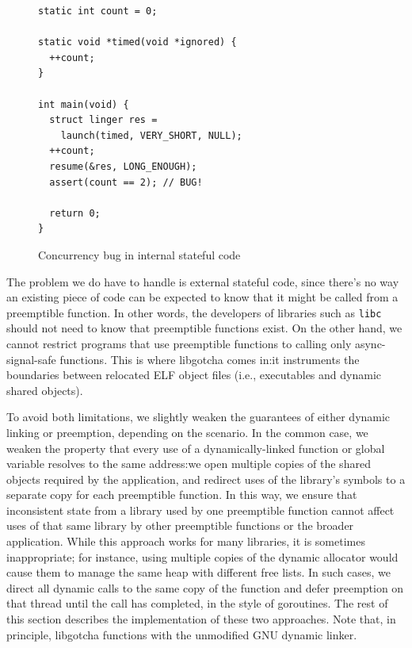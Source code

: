 \begin{figure}
\begin{verbatim}
static int count = 0;

static void *timed(void *ignored) {
  ++count;
}

int main(void) {
  struct linger res =
    launch(timed, VERY_SHORT, NULL);
  ++count;
  resume(&res, LONG_ENOUGH);
  assert(count == 2); // BUG!

  return 0;
}
\end{verbatim}
\caption{Concurrency bug in internal stateful code}
\label{fig:bug}
\end{figure}

The problem we do have to handle is external stateful code, since there's no way an
existing piece of code can be expected to know that it might be called from a
preemptible function.  In other words, the developers of libraries such as
\texttt{libc} should not need to know that preemptible functions exist.  On the other
hand, we cannot restrict programs that use preemptible functions to calling only
async-signal-safe functions.  This is where libgotcha comes in:\@ it instruments the
boundaries between relocated ELF object files (i.e., executables and dynamic shared
objects).

To avoid both limitations, we slightly weaken the guarantees of either dynamic
linking or preemption, depending on the scenario.  In the common case, we weaken the
property that every use of a dynamically-linked function or global variable resolves
to the same address:\@ we open multiple copies of the shared objects required by the
application, and redirect uses of the library's symbols to a separate copy for each
preemptible function.  In this way, we ensure that inconsistent state from a library
used by one preemptible function cannot affect uses of that same library by other
preemptible functions or the broader application.  While this approach works for many
libraries, it is sometimes inappropriate; for instance, using multiple copies of the
dynamic allocator would cause them to manage the same heap with different free lists.
In such cases, we direct all dynamic calls to the same copy of the function and defer
preemption on that thread until the call has completed, in the style of goroutines.
The rest of this section describes the implementation of these two approaches.  Note
that, in principle, libgotcha functions with the unmodified GNU dynamic linker.


